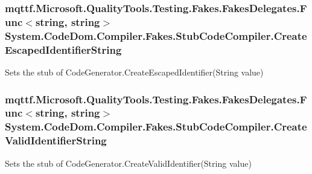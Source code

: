 \hypertarget{class_system_1_1_code_dom_1_1_compiler_1_1_fakes_1_1_stub_code_compiler_a62e12c80e5d46ead9b25906dc774b8b9}{
\subsubsection[{Create\-Escaped\-Identifier\-String}]{\setlength{\rightskip}{0pt plus 5cm}mqttf.\-Microsoft.\-Quality\-Tools.\-Testing.\-Fakes.\-Fakes\-Delegates.\-Func$<$string, string$>$ System.\-Code\-Dom.\-Compiler.\-Fakes.\-Stub\-Code\-Compiler.\-Create\-Escaped\-Identifier\-String}}\label{class_system_1_1_code_dom_1_1_compiler_1_1_fakes_1_1_stub_code_compiler_a62e12c80e5d46ead9b25906dc774b8b9}


Sets the stub of Code\-Generator.\-Create\-Escaped\-Identifier(\-String value)

\hypertarget{class_system_1_1_code_dom_1_1_compiler_1_1_fakes_1_1_stub_code_compiler_a9d6d125dea0e8d09c5cde16f86229fbf}{
\subsubsection[{Create\-Valid\-Identifier\-String}]{\setlength{\rightskip}{0pt plus 5cm}mqttf.\-Microsoft.\-Quality\-Tools.\-Testing.\-Fakes.\-Fakes\-Delegates.\-Func$<$string, string$>$ System.\-Code\-Dom.\-Compiler.\-Fakes.\-Stub\-Code\-Compiler.\-Create\-Valid\-Identifier\-String}}\label{class_system_1_1_code_dom_1_1_compiler_1_1_fakes_1_1_stub_code_compiler_a9d6d125dea0e8d09c5cde16f86229fbf}


Sets the stub of Code\-Generator.\-Create\-Valid\-Identifier(\-String value)

